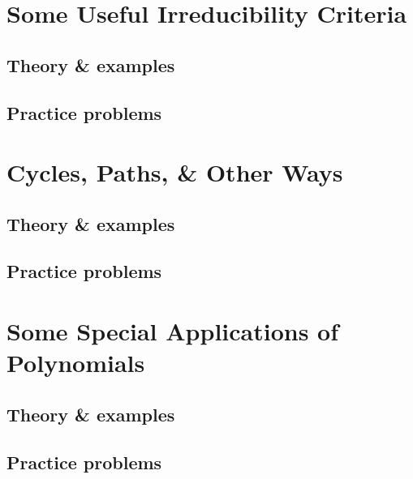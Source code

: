 \documentclass[oneside]{book}
\numberwithin{equation}{section}
\begin{document}

\section{Some Useful Irreducibility Criteria}

\subsection{Theory \& examples}

\subsection{Practice problems}


\section{Cycles, Paths, \& Other Ways}

\subsection{Theory \& examples}

\subsection{Practice problems}


\section{Some Special Applications of Polynomials}

\subsection{Theory \& examples}

\subsection{Practice problems}

\end{document}
